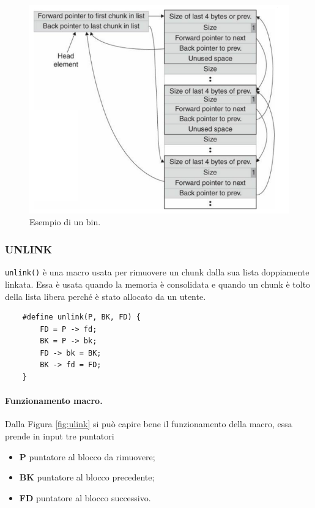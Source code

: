 \begin{figure}[H]
    \centering
    \includegraphics[width=12cm, keepaspectratio]{capitoli/secure_coding/img/cap_4/bin.png}
    \caption{Esempio di un bin.}\label{fig:bin}
\end{figure}

\subsubsection{UNLINK}

\verb|unlink()| è una macro usata per rimuovere un chunk dalla sua lista doppiamente
linkata. Essa è usata quando la memoria è consolidata e quando un chunk è tolto della
lista libera perché è stato allocato da un utente.

\begin{verbatim}
    #define unlink(P, BK, FD) {
        FD = P -> fd;
        BK = P -> bk;
        FD -> bk = BK;
        BK -> fd = FD;
    }
\end{verbatim}

\paragraph{Funzionamento macro.}
Dalla Figura \ref{fig:ulink} si può capire bene il funzionamento della macro,
essa prende in input tre puntatori

\begin{itemize}
    \item \textbf{P} puntatore al blocco da rimuovere;
    \item \textbf{BK} puntatore al blocco precedente;
    \item \textbf{FD} puntatore al blocco successivo.
\end{itemize}

